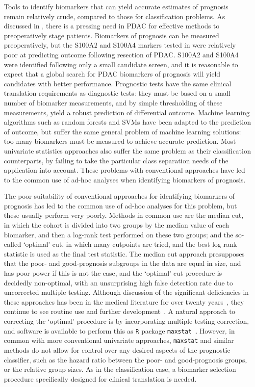 \documentclass[dissertation.tex]{subfiles}
\begin{document}
Tools to identify biomarkers that can yield accurate estimates of prognosis remain relatively crude, compared to those for classification problems.  As discussed in , there is a pressing need in \gls{PDAC} for effective methods to preoperatively stage patients.  Biomarkers of prognosis can be measured preoperatively, but the S100A2 and S100A4 markers tested in  were relatively poor at predicting outcome following resection of \gls{PDAC}.  S100A2 and S100A4 were identified following only a small candidate screen, and it is reasonable to expect that a global search for \gls{PDAC} biomarkers of prognosis will yield candidates with better performance.  Prognostic tests have the same clinical translation requirements as diagnostic tests: they must be based on a small number of biomarker measurements, and by simple thresholding of these measurements, yield a robust prediction of differential outcome.  Machine learning algorithms such as random forests and \glspl{SVM} have been adapted to the prediction of outcome, but suffer the same general problem of machine learning solutions: too many biomarkers must be measured to achieve accurate prediction.  Most univariate statistics approaches also suffer the same problem as their classification counterparts, by failing to take the particular class separation needs of the application into account.  These problems with conventional approaches have led to the common use of ad-hoc analyses when identifying biomarkers of prognosis.

The poor suitability of conventional approaches for identifying biomarkers of prognosis has led to the common use of ad-hoc analyses for this problem, but these usually perform very poorly.  Methods in common use are the median cut, in which the cohort is divided into two groups by the median value of each biomarker, and then a log-rank test performed on these two groups; and the so-called `optimal' cut, in which many cutpoints are tried, and the best log-rank statistic is used as the final test statistic.  The median cut approach presupposes that the poor- and good-prognosis subgroups in the data are equal in size, and has poor power if this is not the case, and the `optimal' cut procedure is decidedly non-optimal, with an unsurprising high false detection rate due to uncorrected multiple testing.  Although discussion of the significant deficiencies in these approaches has been in the medical literature for over twenty years~\cite{Altman1994}, they continue to see routine use and further development~\cite{Budczies2012,Camp2004,Chorlton2014,Yau2010}.  A natural approach to correcting the `optimal' procedure is by incorporating multiple testing correction, and software is available to perform this as \texttt{R} package \texttt{maxstat}~\cite{Chorlton2014,Hothorn2003}.  However, in common with more conventional univariate approaches, \texttt{maxstat} and similar methods do not allow for control over any desired aspects of the prognostic classifier, such as the hazard ratio between the poor- and good-prognosis groups, or the relative group sizes.  As in the classification case, a biomarker selection procedure specifically designed for clinical translation is needed.
\end{document}
